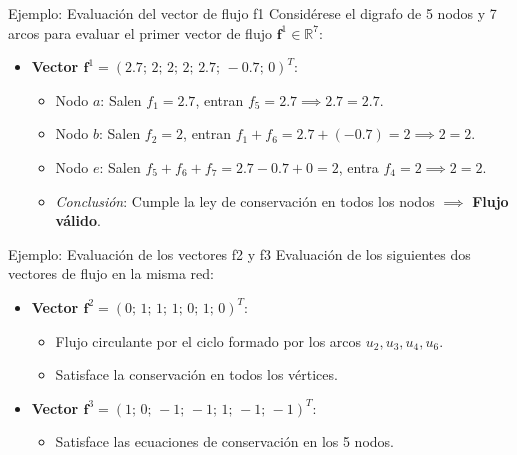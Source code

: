 \documentclass[
  ignorenonframetext,
]{beamer}
\providecommand{\tightlist}{%
  \setlength{\itemsep}{0pt}\setlength{\parskip}{0pt}}
\begin{document}
\begin{frame}{Ejemplo: Evaluación del vector de flujo f1}
\label{ejemplo-evaluaciuxf3n-del-vector-de-flujo-f1}
Considérese el digrafo de 5 nodos y 7 arcos para evaluar el primer
vector de flujo \(\mathbf{f}^1 \in \mathbb{R}^7\):

\begin{itemize}
\tightlist
\item
  \textbf{Vector
  \(\mathbf{f}^1 = (2.7;\, 2;\, 2;\, 2;\, 2.7;\, -0.7;\, 0)^T\)}:

  \begin{itemize}
  \tightlist
  \item
    Nodo \(a\): Salen \(f_1 = 2.7\), entran
    \(f_5 = 2.7 \implies 2.7 = 2.7\).
  \item
    Nodo \(b\): Salen \(f_2 = 2\), entran
    \(f_1 + f_6 = 2.7 + (-0.7) = 2 \implies 2 = 2\).
  \item
    Nodo \(e\): Salen \(f_5 + f_6 + f_7 = 2.7 - 0.7 + 0 = 2\), entra
    \(f_4 = 2 \implies 2 = 2\).
  \item
    \emph{Conclusión}: Cumple la ley de conservación en todos los nodos
    \(\implies\) \textbf{Flujo válido}.
  \end{itemize}
\end{itemize}
\end{frame}

\begin{frame}{Ejemplo: Evaluación de los vectores f2 y f3}
\label{ejemplo-evaluaciuxf3n-de-los-vectores-f2-y-f3}
Evaluación de los siguientes dos vectores de flujo en la misma red:

\begin{itemize}
\tightlist
\item
  \textbf{Vector
  \(\mathbf{f}^2 = (0;\, 1;\, 1;\, 1;\, 0;\, 1;\, 0)^T\)}:

  \begin{itemize}
  \tightlist
  \item
    Flujo circulante por el ciclo formado por los arcos
    \(u_2, u_3, u_4, u_6\).
  \item
    Satisface la conservación en todos los vértices.
  \end{itemize}
\item
  \textbf{Vector
  \(\mathbf{f}^3 = (1;\, 0;\, -1;\, -1;\, 1;\, -1;\, -1)^T\)}:

  \begin{itemize}
  \tightlist
  \item
    Satisface las ecuaciones de conservación en los 5 nodos.
  \end{itemize}
\end{itemize}
\end{frame}
\end{document}
